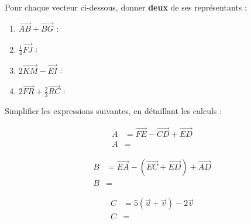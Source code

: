 \documentclass[
	classe=$2^{de}$
]{évaluation}
\newcounter{LetterCounter}
\begin{document}
\begin{exercice}
	\begin{center}
	\end{center}
	Pour chaque vecteur ci-dessous, donner \textbf{deux} de ses représentants :
	\begin{enumerate}
		\item $\vec{AB} + \vec{BG}$ : 
		\item $\frac{1}{4}\vec{FJ}$ : 
		\item $2\vec{KM} - \vec{EI}$ : 
		\item $2\vec{FR} + \frac{2}{3}\vec{RC}$ : 
	\end{enumerate}
\end{exercice}

\begin{exercice}

	Simplifier les expressions suivantes, en détaillant les calculs :
	\begin{multicols}{3}
		\begin{align*}
			A & = \vec{FE} - \vec{CD} + \vec{ED} \\
			A & =
		\end{align*}

		\columnbreak

		\begin{align*}
			B & = \vec{EA} - (\vec{EC} + \vec{ED}) + \vec{AD} \\
			B & =
		\end{align*}

		\columnbreak

		\begin{align*}
			C & = 5(\vec{u} + \vec{v}) - 2\vec{v} \\
			C & =
		\end{align*}
	\end{multicols}
\end{exercice}
\end{document}

